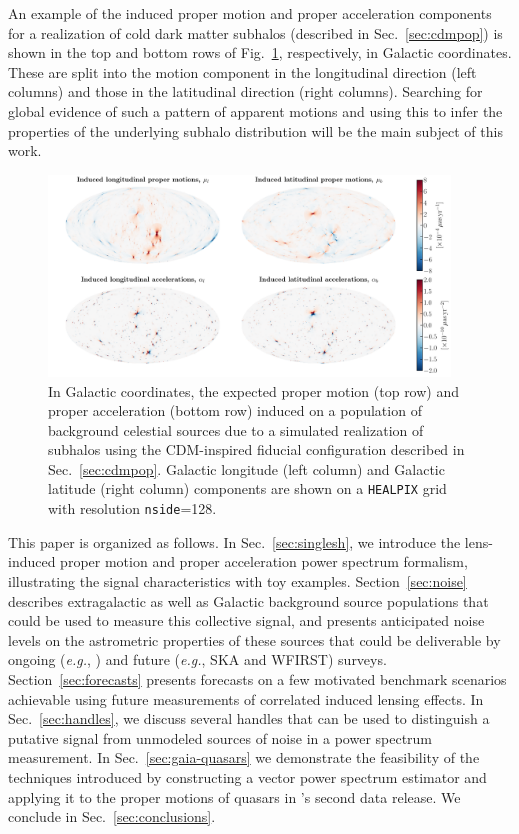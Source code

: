 \documentclass[prd,aps,twocolumn,nofootinbib,superscriptaddress,preprintnumbers,balancelastpage,longbibliography,floatfix]{revtex4-1}
\begin{document}
An example of the induced proper motion and proper acceleration components for a realization of cold dark matter subhalos (described in Sec.~\ref{sec:cdmpop}) is shown in the top and bottom rows of Fig.~\ref{fig:population_maps}, respectively, in Galactic coordinates. These are split into the motion component in the longitudinal direction (left columns) and those in the latitudinal direction (right columns). Searching for global evidence of such a pattern of apparent motions and using this to infer the properties of the underlying subhalo distribution will be the main subject of this work.  

\begin{figure}[tbp]
\centering
\includegraphics[width=0.95\textwidth]{plots/maps_mu_alpha.pdf}
\caption{In Galactic coordinates, the expected proper motion {(top row)} and proper acceleration {(bottom row)} induced on a population of background celestial sources due to a simulated realization of subhalos using the CDM-inspired fiducial configuration described in Sec.~\ref{sec:cdmpop}. Galactic longitude {(left column)} and Galactic latitude {(right column)} components are shown on a \texttt{HEALPIX} grid with resolution \texttt{nside}=128. }
\label{fig:population_maps}
\end{figure}

This paper is organized as follows. In Sec.~\ref{sec:singlesh}, we introduce the lens-induced proper motion and proper acceleration power spectrum formalism, illustrating the signal characteristics with toy examples. Section~\ref{sec:noise} describes extragalactic as well as Galactic background source populations that could be used to measure this collective signal, and presents anticipated noise levels on the astrometric properties of these sources that could be deliverable by ongoing (\emph{e.g.}, \Gaia) and future (\emph{e.g.}, SKA and WFIRST) surveys. Section~\ref{sec:forecasts} presents forecasts on a few motivated benchmark scenarios achievable using future measurements of correlated induced lensing effects. In Sec.~\ref{sec:handles}, we discuss several handles that can be used to distinguish a putative signal from unmodeled sources of noise in a power spectrum measurement. In Sec.~\ref{sec:gaia-quasars} we demonstrate the feasibility of the techniques introduced by constructing a vector power spectrum estimator and applying it to the proper motions of quasars in \Gaia's second data release. We conclude in Sec.~\ref{sec:conclusions}.
\end{document}
